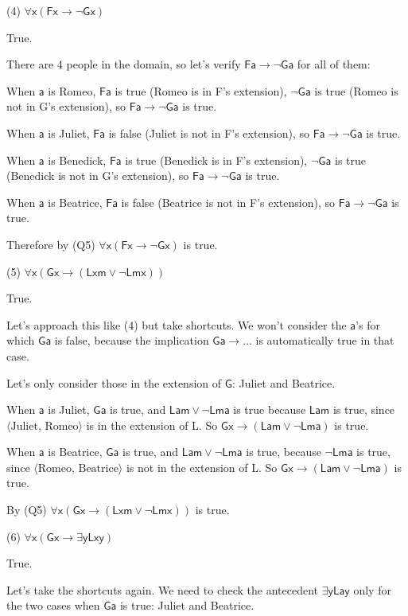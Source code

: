 \documentclass[14pt]{extarticle}
\begin{document}
(4) $\mathsf{\forall x(Fx \to \neg Gx)}$

True.

There are 4 people in the domain, so let's verify $\mathsf{Fa \to \neg Ga}$ for all of them:

When $\mathsf{a}$ is Romeo, $\mathsf{Fa}$ is true (Romeo is in F's extension), $\mathsf{\neg Ga}$ is true (Romeo is not in G's extension), so $\mathsf{Fa \to \neg Ga}$ is true.

When $\mathsf{a}$ is Juliet, $\mathsf{Fa}$ is false (Juliet is not in F's extension), so $\mathsf{Fa \to \neg Ga}$ is true.

When $\mathsf{a}$ is Benedick, $\mathsf{Fa}$ is true (Benedick is in F's extension), $\mathsf{\neg Ga}$ is true (Benedick is not in G's extension), so $\mathsf{Fa \to \neg Ga}$ is true.

When $\mathsf{a}$ is Beatrice, $\mathsf{Fa}$ is false (Beatrice is not in F's extension), so $\mathsf{Fa \to \neg Ga}$ is true.

Therefore by (Q5) $\mathsf{\forall x(Fx \to \neg Gx)}$ is true.

(5) $\mathsf{\forall x(Gx \to (Lxm \vee \neg Lmx))}$

True.

Let's approach this like (4) but take shortcuts. We won't consider the $\mathsf{a}$'s for which $\mathsf{Ga}$ is false, because the implication $\mathsf{Ga \to \ldots}$ is automatically true in that case.

Let's only consider those in the extension of $\mathsf{G}$: Juliet and Beatrice.

When $\mathsf{a}$ is Juliet, $\mathsf{Ga}$ is true, and $\mathsf{Lam \vee \neg Lma}$ is true because $\mathsf{Lam}$ is true, since $\langle \text{Juliet, Romeo}\rangle$ is in the extension of L. So $\mathsf{Gx \to (Lam \vee \neg Lma)}$ is true.

When $\mathsf{a}$ is Beatrice, $\mathsf{Ga}$ is true, and $\mathsf{Lam \vee \neg Lma}$ is true, because $\mathsf{\neg Lma}$ is true, since $\langle \text{Romeo, Beatrice}\rangle$ is not in the extension of L. So $\mathsf{Gx \to (Lam \vee \neg Lma)}$ is true.

By (Q5) $\mathsf{\forall x(Gx \to (Lxm \vee \neg Lmx))}$ is true.

(6) $\mathsf{\forall x(Gx \to \exists yLxy)}$

True.

Let's take the shortcuts again. We need to check the antecedent $\mathsf{\exists y Lay}$ only for the two cases when $\mathsf{Ga}$ is true: Juliet and Beatrice.
\end{document}
